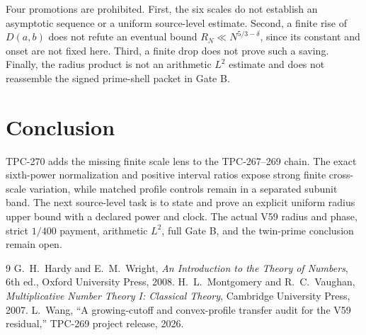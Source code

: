 \documentclass[11pt]{article}
\begin{document}
Four promotions are prohibited. First, the six scales do not establish an
asymptotic sequence or a uniform source-level estimate. Second, a finite rise
of \(D(a,b)\) does not refute an eventual bound
\(R_N\ll N^{5/3-\delta}\), since its constant and onset are not fixed here.
Third, a finite drop does not prove such a saving. Finally, the radius product
is not an arithmetic \(L^2\) estimate and does not reassemble the signed
prime-shell packet in Gate B.

\section{Conclusion}
TPC-270 adds the missing finite scale lens to the TPC-267--269 chain. The exact
sixth-power normalization and positive interval ratios expose strong finite
cross-scale variation, while matched profile controls remain in a separated
subunit band. The next source-level task is to state and prove an explicit
uniform radius upper bound with a declared power and clock. The actual V59
radius and phase, strict \(1/400\) payment, arithmetic \(L^2\), full Gate B, and
the twin-prime conclusion remain open.

\begin{thebibliography}{9}
 G.~H.~Hardy and E.~M.~Wright,
\emph{An Introduction to the Theory of Numbers}, 6th ed., Oxford University
Press, 2008.
 H.~L.~Montgomery and R.~C.~Vaughan,
\emph{Multiplicative Number Theory I: Classical Theory}, Cambridge University
Press, 2007.
 L.~Wang, ``A growing-cutoff and convex-profile transfer audit
for the V59 residual,'' TPC-269 project release, 2026.
\end{thebibliography}
\end{document}
